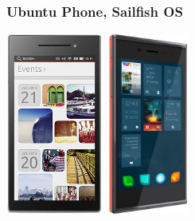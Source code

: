 \documentclass[12pt, xcolor={svgnames,table}]{beamer}
\begin{document}
\begin{frame}
  \frametitle{Ubuntu Phone, Sailfish OS}
    \begin{center}
      \includegraphics[height=6cm]{img/ubuntuphone.jpg}
      \hspace{0.5cm}
      \includegraphics[height=6cm]{img/sailfishos.jpg}
    \end{center}
\end{frame}
\end{document}
